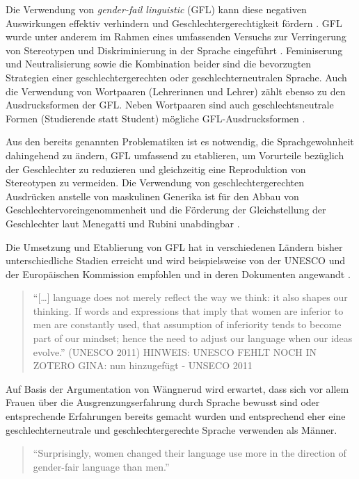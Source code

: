 \documentclass[12pt, 
    twoside=false, 
    bibliography=totoc, 
    numbers=endperiod, 
    headings=normal, 
    toc=chapterentrydotfill
    ]{scrbook}
\begin{document}
Die Verwendung von \emph{gender-fail linguistic} (GFL) kann diese negativen Auswirkungen effektiv verhindern und Geschlechtergerechtigkeit fördern \parencite[1]{menegatti_2017}. GFL wurde unter anderem im Rahmen eines umfassenden Versuchs zur Verringerung von Stereotypen und Diskriminierung in der Sprache eingeführt \parencite[2]{sczesny_2016}. Feminiserung und Neutralisierung sowie die Kombination beider sind die bevorzugten Strategien einer geschlechtergerechten oder geschlechterneutralen Sprache. Auch die Verwendung von Wortpaaren (Lehrerinnen und Lehrer) zählt ebenso zu den Ausdrucksformen der GFL. Neben Wortpaaren sind auch geschlechtsneutrale Formen (Studierende statt Student) mögliche GFL-Ausdrucksformen \parencite[2]{sczesny_2016}.

Aus den bereits genannten Problematiken ist es notwendig, die Sprachgewohnheit dahingehend zu ändern, GFL umfassend zu etablieren, um Vorurteile bezüglich der Geschlechter zu reduzieren und gleichzeitig eine Reproduktion von Stereotypen zu vermeiden. Die Verwendung von geschlechtergerechten Ausdrücken anstelle von maskulinen Generika ist für den Abbau von Geschlechtervoreingenommenheit und die Förderung der Gleichstellung der Geschlechter laut Menegatti und Rubini unabdingbar \parencite*{menegatti_2017}.

Die Umsetzung und Etablierung von GFL hat in verschiedenen Ländern bisher unterschiedliche Stadien erreicht und wird beispielsweise von der UNESCO und der Europäischen Kommission empfohlen und in deren Dokumenten angewandt \parencite[4]{sczesny_2016}.

\begin{quote}
    \enquote{[…] language does not merely reflect the way we think: it also shapes our thinking. If words and expressions that imply that women are inferior to men are constantly used, that assumption of inferiority tends to become part of our mindset; hence the need to adjust our language when our ideas evolve.} (UNESCO 2011) HINWEIS: UNESCO FEHLT NOCH IN ZOTERO GINA: nun hinzugefügt - UNSECO 2011
\end{quote}

Auf Basis der Argumentation von Wängnerud \parencites*{wangnerud_2000}{wangnerud_2009} wird erwartet, dass sich vor allem Frauen über die Ausgrenzungserfahrung durch Sprache bewusst sind oder entsprechende Erfahrungen bereits gemacht wurden und entsprechend eher eine geschlechterneutrale und geschlechtergerechte Sprache verwenden als Männer. 

\begin{quote}
    \enquote {Surprisingly, women changed their
language use more in the direction of gender-fair language than men.} \parencite[555]{koeser_2014}
\end{quote}
\end{document}
